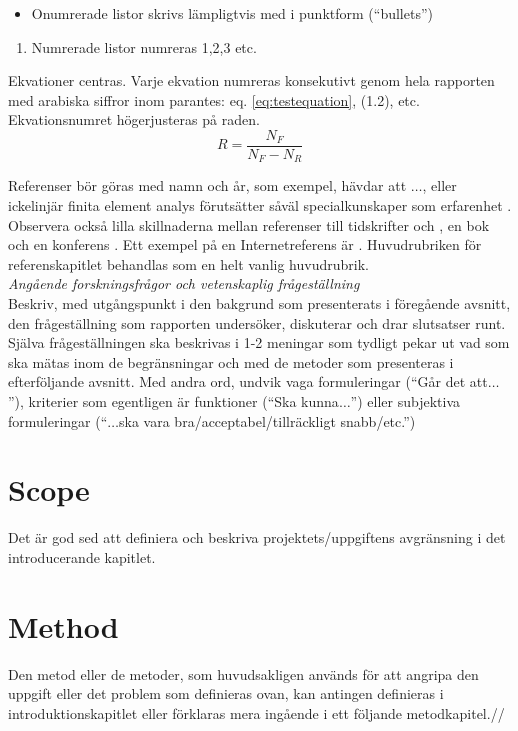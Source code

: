 \documentclass[a4paper,11pt]{kth-mag}
\begin{document}
\begin{itemize}
\item Onumrerade listor skrivs lämpligtvis med i punktform (``bullets'')
\end{itemize}

\begin{enumerate}
\item Numrerade listor numreras 1,2,3 etc.
\end{enumerate}

\noindent{}Ekvationer centras. Varje ekvation numreras konsekutivt genom hela rapporten med arabiska siffror inom parantes: eq. \eqref{eq:testequation}, (1.2), etc. Ekvationsnumret högerjusteras på raden.
\begin{equation}
R= \frac{N_F}{N_F-N_R} \label{eq:testequation}
\end{equation}

\noindent{}Referenser bör göras med namn och år, som exempel, \cite{Angell1999} hävdar att $\ldots$, eller ickelinjär finita element analys förutsätter såväl specialkunskaper som erfarenhet \cite{DeBorst2012}. Observera också lilla skillnaderna mellan referenser till tidskrifter \cite{VanWezel2001} och \cite{Angell1999}, en bok \cite{DeBorst2012} och en konferens \cite{Eppinger2001}. Ett exempel på en Internetreferens är \cite{StandishGroup1994}. Huvudrubriken för referenskapitlet behandlas som en helt vanlig huvudrubrik. \\


\noindent{}\emph{Angående forskningsfrågor och vetenskaplig frågeställning}\\
Beskriv, med utgångspunkt i den bakgrund som presenterats i föregående avsnitt, den frågeställning som rapporten undersöker, diskuterar och drar slutsatser runt. Själva frågeställningen ska beskrivas i 1-2 meningar som tydligt pekar ut vad som ska mätas inom de begränsningar och med de metoder som presenteras i efterföljande avsnitt. Med andra ord, undvik vaga formuleringar (``Går det att$\ldots$''), kriterier som egentligen är funktioner (``Ska kunna$\ldots$'') eller subjektiva formuleringar (``$\ldots$ska vara bra/acceptabel/tillräckligt snabb/etc.'')
\section{Scope}
Det är god sed att definiera och beskriva projektets/uppgiftens  avgränsning i det introducerande kapitlet.

\section{Method}
Den metod eller de metoder, som huvudsakligen används för att angripa den uppgift eller det problem som definieras ovan, kan antingen definieras i introduktionskapitlet eller förklaras mera ingående i ett följande metodkapitel.//
\end{document}
